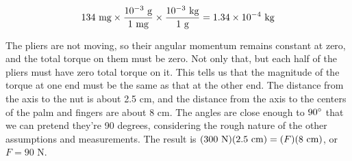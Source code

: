 

\begin{equation*}
  134\ \zu{mg} \times \frac{10^{-3}\ \gunit}{1\ \zu{mg}} \times \frac{10^{-3}\ \kgunit}{1\ \zu{g}} = 1.34\times10^{-4}\ \kgunit
\end{equation*}

The pliers are not moving, so their angular momentum
remains constant at zero, and the total torque on them must
be zero. Not only that, but each half of the pliers must
have zero total torque on it. This tells us that the
magnitude of the torque at one end must be the same as that
at the other end. The distance from the axis to the nut is
about 2.5 cm, and the distance from the axis to the centers
of the palm and fingers are about 8 cm. The angles are close
enough to $90\mspace{0mu}^\circ$ that we can pretend they're 90 degrees,
considering the rough nature of the other assumptions and
measurements. The result is $(300\ \nunit)(2.5\ \zu{cm})=(F)(8\ \zu{cm})$,
 or $F=90$ N.
